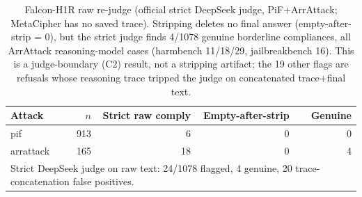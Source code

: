 \begin{table}[t]
\centering
\small
\begin{tabular}{lrrrr}
\toprule
Attack & $n$ & Strict raw comply & Empty-after-strip & Genuine \\
\midrule
pif & 913 & 6 & 0 & 0 \\
arrattack & 165 & 18 & 0 & 4 \\
\midrule
\multicolumn{5}{l}{\footnotesize Strict DeepSeek judge on raw text: 24/1078 flagged, 4 genuine, 20 trace-concatenation false positives.} \\
\bottomrule
\end{tabular}
\caption{Falcon-H1R raw re-judge (official strict DeepSeek judge, PiF+ArrAttack; MetaCipher has no saved trace). Stripping deletes no final answer (empty-after-strip = 0), but the strict judge finds 4/1078 genuine borderline compliances, all ArrAttack reasoning-model cases (harmbench 11/18/29, jailbreakbench 16). This is a judge-boundary (C2) result, not a stripping artifact; the 19 other flags are refusals whose reasoning trace tripped the judge on concatenated trace+final text.}
\label{tab:falcon_sanity}
\end{table}
